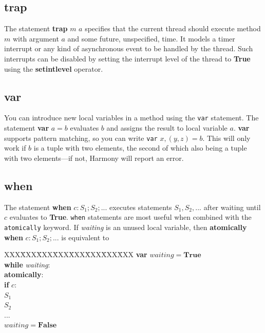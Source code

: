 \documentclass{report}
\newenvironment{code}{
\tcolorbox
}{
\endtcolorbox
}
\begin{document}
\subsection*{\textbf{trap}}

The statement \textbf{trap} $m$ $a$ specifies that the current thread
should execute method $m$ with argument $a$ and some future, unspecified,
time.  It models a timer interrupt or any kind of asynchronous event to
be handled by the thread.  Such interrupts can be disabled by setting
the interrupt level of the thread to \textbf{True} using the
\textbf{setintlevel} operator.

\subsection*{\textbf{var}}

You can introduce new local variables in a method using the
\texttt{var} statement.
The statement \textbf{var} $a = b$ evaluates $b$ and assigns
the result to local variable $a$.
\textbf{var} supports pattern matching, so you can
write \texttt{var} $x, (y, z) = b$.  This will only work
if $b$ is a tuple with two elements, the second of which also being a
tuple with two elements---if not, Harmony will report an error.

\subsection*{\textbf{when}}

The statement \textbf{when} $c: S_1; S_2; ...$ executes statements
$S_1, S_2, ...$ after waiting until $c$ evaluates to \textbf{True}.
\texttt{when} statements are most useful when combined with the
\texttt{atomically} keyword.
If \textit{waiting} is an unused local variable,
then \textbf{atomically when} $c: S_1; S_2; ...$ is equivalent to

\begin{code}
\begin{tabbing}
XXX\=XXX\=XXX\=XXX\=XXX\=XXX\=XXX\=XXX\kill
\>\textbf{var} $\mathit{waiting} = \mathbf{True}$ \\
\>\textbf{while} \textit{waiting}: \\
\>\>\textbf{atomically}: \\
\>\>\>\textbf{if} $c$:\\
\>\>\>\>$S_1$ \\
\>\>\>\>$S_2$ \\
\>\>\>\>$...$ \\
\>\>\>\>$\mathit{waiting} = \mathbf{False}$
\end{tabbing}
\end{code}
\end{document}
